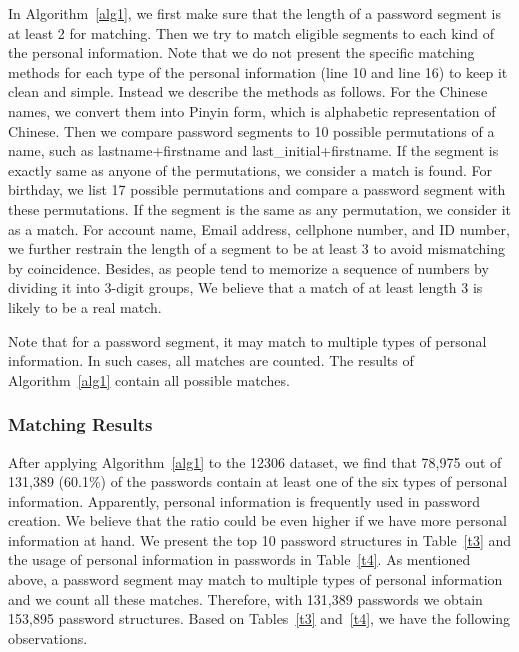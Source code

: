 In Algorithm~\ref{alg1}, we first make sure that the length of a
password segment is at least 2 for matching.  Then we try to match eligible segments to each kind of the personal information. Note that we do not present the specific matching methods
for each type of the personal information (line 10 and line 16) to
keep it clean and simple. Instead we describe the methods as follows.
For the Chinese names, we convert them into Pinyin form, which is
alphabetic representation of Chinese. Then we compare password
segments to 10 possible permutations of a name, such as
lastname+firstname and last\_initial+firstname. If the segment is
exactly same as anyone of the permutations, we consider a match is
found. 
For birthday, we list 17 possible permutations and compare a password
segment with these permutations. If the segment is the same as any
permutation, we consider it as a match. 
For account name, Email address, cellphone number, and ID number, we further restrain
the length of a segment to be at least 3 to avoid mismatching by
coincidence. Besides, as people tend to memorize a sequence of numbers by
dividing it into 3-digit groups, We believe that a match of at least
length 3 is likely to be a real match. 

Note that for a password segment, it may match to multiple types of
personal information. In such cases, all matches are counted. The results of Algorithm~\ref{alg1} contain all possible matches. \\

\subsubsection{Matching Results}
\label{matchingresult}
After applying Algorithm~\ref{alg1} to the 12306 dataset, we find that
78,975 out of 131,389 (60.1\%) of the passwords contain at least one
of the six types of personal information. Apparently, personal
information is frequently used in password creation. We believe that
the ratio could be even higher if we have more personal information at
hand. We present the top 10 password structures in Table~\ref{t3} and
the usage of personal information in passwords in Table~\ref{t4}.  As
mentioned above, a password segment may match to multiple types of
personal information and we count all these matches. Therefore, with
131,389 passwords we obtain 153,895 password structures. Based on
Tables~\ref{t3} and~\ref{t4}, we have the following observations.

